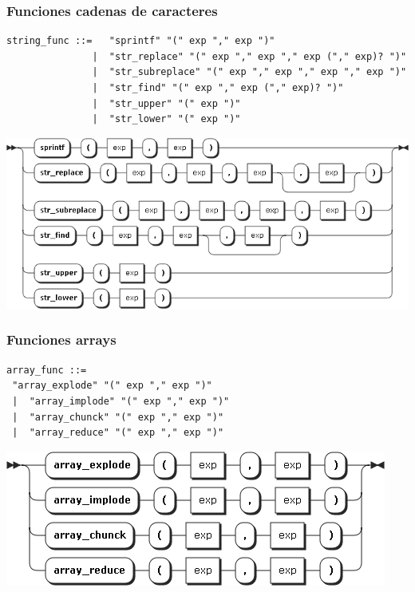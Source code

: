\subsubsection{Funciones cadenas de caracteres}
\begin{lstlisting}[style=nonumbers]      
string_func ::=   "sprintf" "(" exp "," exp ")"
               |  "str_replace" "(" exp "," exp "," exp ("," exp)? ")"
               |  "str_subreplace" "(" exp "," exp "," exp "," exp ")"
               |  "str_find" "(" exp "," exp ("," exp)? ")"
               |  "str_upper" "(" exp ")"
               |  "str_lower" "(" exp ")"
\end{lstlisting}  
\begin{center}
\includegraphics[scale=0.4]{diagram/string_func.png} \\
\end{center}

\subsubsection{Funciones arrays}
\begin{multicols}{2}
\begin{lstlisting}[style=nonumbers]      
array_func ::= 
 "array_explode" "(" exp "," exp ")"
 |  "array_implode" "(" exp "," exp ")"
 |  "array_chunck" "(" exp "," exp ")"
 |  "array_reduce" "(" exp "," exp ")"
\end{lstlisting}  
\columnbreak	
\begin{center}
\includegraphics[scale=0.5]{diagram/array_func.png} \\
\end{center}
\end{multicols}

